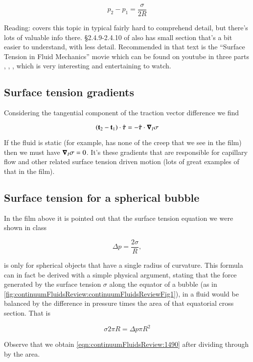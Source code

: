 \begin{equation}\label{eqn:continuumFluidsReview:2110}
p_2 - p_1 = \frac{\sigma}{2 R} 
\end{equation}

Reading: \citep{landau1987course} covers this topic in typical fairly hard to comprehend detail, but there's lots of valuable info there.  \S 2.4.9-2.4.10 of \citep{granger1995fluid} also has small section that's a bit easier to understand, with less detail.  Recommended in that text is the ``Surface Tension in Fluid Mechanics'' movie which can be found on youtube in three parts , , , which is very interesting and entertaining to watch.

\subsection{Surface tension gradients}

Considering the tangential component of the traction vector difference we find

\begin{equation}\label{eqn:continuumFluidsReview:2130}
(\mathbf{t}_2 - \mathbf{t}_1) \cdot \hat{\boldsymbol{\tau}} = - \hat{\boldsymbol{\tau}} \cdot \boldsymbol{\nabla}_I \sigma
\end{equation}

If the fluid is static (for example, has none of the creep that we see in the film) then we must have $\boldsymbol{\nabla}_I \sigma = 0$.  It's these gradients that are responsible for capillary flow and other related surface tension driven motion (lots of great examples of that in the film).

\subsection{Surface tension for a spherical bubble}

In the film above it is pointed out that the surface tension equation we were shown in class

\begin{equation}\label{eqn:continuumFluidsReview:1490}
\Delta p = \frac{2 \sigma}{R},
\end{equation}

is only for spherical objects that have a single radius of curvature.  This formula can in fact be derived with a simple physical argument, stating that the force generated by the surface tension $\sigma$ along the equator of a bubble (as in \ref{fig:continuumFluidsReview:continuumFluidsReviewFig1}), in a fluid would be balanced by the difference in pressure times the area of that equatorial cross section.  That is


\begin{equation}\label{eqn:continuumFluidsReview:1510}
\sigma 2 \pi R = \Delta p \pi R^2
\end{equation}

Observe that we obtain \ref{eqn:continuumFluidsReview:1490} after dividing through by the area.

